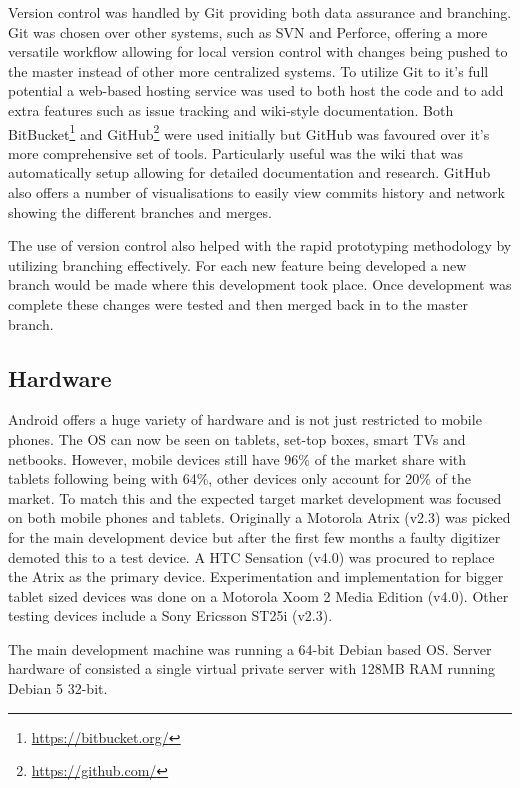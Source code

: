 Version control was handled by Git providing both data assurance and branching. Git was chosen over other systems, such as SVN and Perforce, offering a more versatile workflow allowing for local version control with changes being pushed to the master instead of other more centralized systems. To utilize Git to it's full potential a web-based hosting service was used to both host the code and to add extra features such as issue tracking and wiki-style documentation. Both BitBucket\footnote{\url{https://bitbucket.org/}} and GitHub\footnote{\url{https://github.com/}} were used initially but GitHub was favoured over it's more comprehensive set of tools. Particularly useful was the wiki that was automatically setup allowing for detailed documentation and research. GitHub also offers a number of visualisations to easily view commits history and network showing the different branches and merges.

The use of version control also helped with the rapid prototyping methodology by utilizing branching effectively. For each new feature being developed a new branch would be made where this development took place. Once development was complete these changes were tested and then merged back in to the master branch.

\subsection{Hardware}
Android offers a huge variety of hardware and is not just restricted to mobile phones. The OS can now be seen on tablets, set-top boxes, smart TVs and netbooks. However, mobile devices still have 96\% of the market share with tablets following being with 64\%, other devices only account for 20\% of the market. To match this and the expected target market development was focused on both mobile phones and tablets. Originally a Motorola Atrix (v2.3) was picked for the main development device but after the first few months a faulty digitizer demoted this to a test device. A HTC Sensation (v4.0) was procured to replace the Atrix as the primary device. Experimentation and implementation for bigger tablet sized devices was done on a Motorola Xoom 2 Media Edition (v4.0). Other testing devices include a Sony Ericsson ST25i (v2.3).

The main development machine was running a 64-bit Debian based OS. Server hardware of consisted a single virtual private server with 128MB RAM running Debian 5 32-bit.